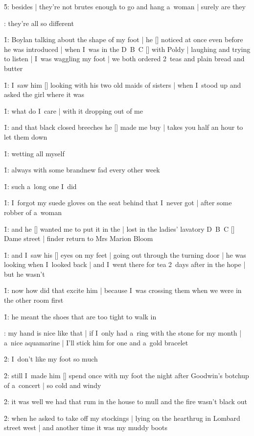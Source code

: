 \f5:
besides |
they're not brutes enough to go and hang a~woman |
surely are they




:
they're all so different

\f1:
Boylan talking about the shape of my foot |
he [\boylan] noticed at once even before he was introduced |
when I~was in the D~B~C [\dbc] with Poldy |
laughing and trying to listen |
I~was waggling my foot |
we both ordered 2~teas and plain bread and butter

\f1:
I~saw him [\boylan] looking with his two old maids of sisters |
when I~stood up and asked the girl where it was

\f1:
what do I~care |
with it dropping out of me

\f1:
and that black closed breeches he [\bloom] made me buy |
takes you half an hour to let them down

\f1:
wetting all myself

\f1:
always with some brandnew fad every other week

\f1:
such a~long one I~did

\f1:
I~forgot my suede gloves on the seat behind that I~never got |
after some robber of a~woman

\f1:
and he [\bloom] wanted me to put it in the  |
lost in the ladies' lavatory D~B~C [\dbc] Dame street |
finder return to Mrs Marion Bloom

\f1:
and I~saw his [\boylan] eyes on my feet |
going out through the turning door |
he was looking when I~looked back |
and I~went there for tea 2~days after in the hope |
but he wasn't

\f1:
now how did that excite him |
because I~was crossing them when we were in the other room first

\f1:
he meant the shoes that are too tight to walk in

:
my hand is nice like that |
if I~only had a~ring with the stone for my month |
a~nice aquamarine |
I'll stick him for one and a~gold bracelet

\f2:
I~don't like my foot so much

\f2:
still I~made him [\bloom] spend once with my foot
the night after Goodwin's botchup of a~concert |
so cold and windy

\f2:
it was well we had that rum in the house to mull and the fire wasn't black out

\f2:
when he asked to take off my stockings |
lying on the hearthrug in Lombard street west |
and another time it was my muddy boots

